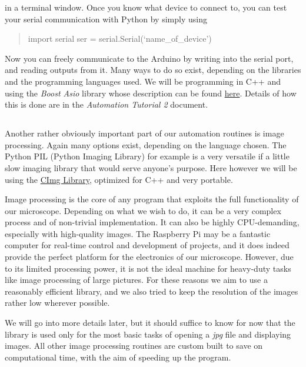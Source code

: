 \documentclass[a4paper]{article}
\begin{document}
			\noindent
			in a terminal window. 
			Once you know what device to connect to, you can test your serial communication with Python by simply using
		
		\begin{quote}
			import serial\newline
			ser = serial.Serial(`name\_{}of\_{}device')
		\end{quote}
		
			Now you can freely communicate to the Arduino by writing into the serial port, and reading outputs from it. 
			Many ways to do so exist, depending on the libraries and the programming languages used.
			We will be programming in C++ and using the \emph{Boost Asio} library whose description can be found \href{http://www.boost.org/doc/libs/1_54_0/doc/html/boost_asio.html}{here}. 
			Details of how this is done are in the \emph{Automation Tutorial 2} document.
		
	\subsection*{}
		
			Another rather obviously important part of our automation routines is image processing. 
			Again many options exist, depending on the language chosen. 
			The Python PIL (Python Imaging Library) for example is a very versatile if a little slow imaging library that would serve anyone's purpose.
			Here however we will be using the \href{http://cimg.sourceforge.net/}{CImg Library}, optimized for C++ and very portable.
			
			Image processing is the core of any program that exploits the full functionality of our microscope. 
			Depending on what we wish to do, it can be a very complex process and of non-trivial implementation. 
			It can also be highly CPU-demanding, especially with high-quality images.\newline{}
			The Raspberry Pi may be a fantastic computer for real-time control and development of projects, and it does indeed provide the perfect platform for the electronics of our microscope.
			However, due to its limited processing power, it is not the ideal machine for heavy-duty tasks like image processing of large pictures.
			For these reasons we aim to use a reasonably efficient library, and we also tried to keep the resolution of the images rather low wherever possible.
			
			We will go into more details later, but it should suffice to know for now that the library is used only for the most basic tasks of opening a \emph{jpg} file and displaying images. 
			All other image processing routines are custom built to save on computational time, with the aim of speeding up the program.
	
\end{document}
